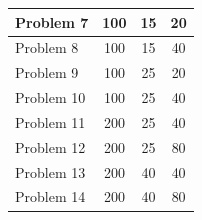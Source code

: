 \begin{table}[H]
\begin{tabular}{l|c|c|c}
Problem 7  & 100                                                                            & 15                                                                                        & 20                                                                                  \\ \hline
Problem 8  & 100                                                                            & 15                                                                                        & 40                                                                                  \\ \hline
Problem 9  & 100                                                                            & 25                                                                                        & 20                                                                                  \\ \hline
Problem 10 & 100                                                                            & 25                                                                                        & 40                                                                                  \\ \hline
Problem 11 & 200                                                                            & 25                                                                                        & 40                                                                                  \\ \hline
Problem 12 & 200                                                                            & 25                                                                                        & 80                                                                                  \\ \hline
Problem 13 & 200                                                                            & 40                                                                                        & 40                                                                                  \\ \hline
Problem 14 & 200                                                                            & 40                                                                                        & 80                                                                                  \\ \hline
\end{tabular}
\end{table}



